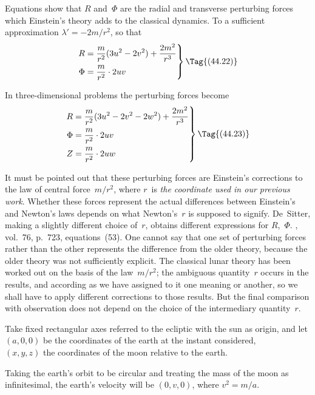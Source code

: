 \documentclass[12pt]{book}
\begin{document}
Equations  show that $R$ and~$\Phi$ are the radial and transverse perturbing
forces which Einstein's theory adds to the classical dynamics. To a
sufficient approximation $\lambda' = -2m/r^{2}$, so that
\[
\left.
\begin{aligned}
  R &= \frac{m}{r^{2}} (3u^{2} - 2v^{2}) + \frac{2m^{2}}{r^{3}}\\
  \Phi &= \frac{m}{r^{2}} \cdot 2 u v
\end{aligned}
\right\}
\Tag{(44.22)}
\]

In three-dimensional problems the perturbing forces become
\[
\left.
\begin{aligned}
  R &= \frac{m}{r^{2}} (3u^{2} - 2v^{2} - 2w^{2}) + \frac{2m^{2}}{r^{3}}\\
  \Phi &= \frac{m}{r^{2}} \cdot 2 u v\\
  Z &= \frac{m}{r^{2}} \cdot 2 u w
\end{aligned}
\right\}
\Tag{(44.23)}
\]

It must be pointed out that these perturbing forces are Einstein's corrections
to the law of central force~$m/r^{2}$, where $r$~is \emph{the coordinate used in our
previous work}. Whether these forces represent the actual differences between
Einstein's and Newton's laws depends on what Newton's~$r$ is supposed to
signify. De~Sitter, making a slightly different choice of~$r$, obtains different
expressions for $R$,~$\Phi$\footnotemark.\footnotetext
  {, vol.~76, p.~723, equations~(53).}
One cannot say that one set of perturbing forces
rather than the other represents the difference from the older theory, because
the older theory was not sufficiently explicit. The classical lunar theory
has been worked out on the basis of the law~$m/r^{2}$; the ambiguous quantity~$r$
occurs in the results, and according as we have assigned to it one meaning or
another, so we shall have to apply different corrections to those results. But
the final comparison with observation does not depend on the choice of the
intermediary quantity~$r$.

Take fixed rectangular axes referred to the ecliptic with the sun as origin,
and let \\
\Indent $(a, 0, 0)$ be the coordinates of the earth at the instant considered, \\
\Indent $(x, y, z)$ the coordinates of the moon relative to the earth.

Taking the earth's orbit to be circular and treating the mass of the moon
as infinitesimal, the earth's velocity will be $(0, v, 0)$, where $v^{2} = m/a$.
\end{document}

